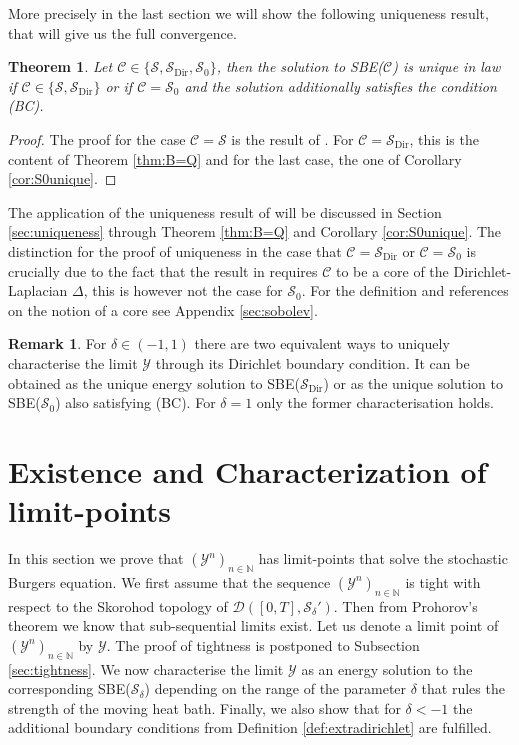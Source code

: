 \documentclass[a4paper, reqno, 12pt]{amsart}
\theoremstyle{plain}
\newtheorem{theorem}[definition]{Theorem}
\theoremstyle{definition}
\newtheorem{remark}[definition]{Remark}
\newcommand{\N}{\mathbb{N}}
\newcommand{\Sdir}{\mathcal{S}_{\text{Dir}}}
\begin{document}
More precisely in the last section we will show the following uniqueness result, that will give us the full convergence. 

\begin{theorem}
 \label{thm:SBEunique}
    Let $\mathcal C \in \{ \mathcal S,\Sdir,\mathcal S_0\}$, then the solution to SBE($\mathcal C$) is unique in law  if $\mathcal C\in \{ \mathcal S,\Sdir\}$ or if $\mathcal C = \mathcal S_0$ and the solution additionally satisfies the condition (BC).
\end{theorem}

\begin{proof}
    The proof for the case $\mathcal C = \mathcal S$ is the result of \cite{GP18}. For $\mathcal C = \Sdir$, this is the content of Theorem \ref{thm:B=Q} and for the last case, the one of Corollary \ref{cor:S0unique}.
\end{proof}


The application of the uniqueness result of \cite{GPP24} will be discussed in Section \ref{sec:uniqueness} through Theorem \ref{thm:B=Q} and Corollary \ref{cor:S0unique}. The distinction for the proof of uniqueness in the case that $\mathcal C = \Sdir$ or $\mathcal C = \mathcal S_0$ is crucially due to the fact that the result in \cite{GPP24} requires $\mathcal C$ to be a core of the Dirichlet-Laplacian $\Delta$, this is however not the case for $\mathcal S_0$. For the definition and references on the notion of a core see Appendix \ref{sec:sobolev}.

\begin{remark}
 For $\delta \in (-1,1)$ there are two equivalent ways to uniquely characterise the limit $\mathcal Y$ through its Dirichlet boundary condition. It can be obtained as the unique energy solution to SBE($\Sdir$) or as the unique solution to SBE($\mathcal S_0$) also satisfying (BC). For $\delta = 1$ only the former characterisation holds. 
\end{remark}



\section{Existence and Characterization of limit-points} 
\label{sec:existenceandtightness}

In this section we prove that $(\mathcal Y^n)_{n\in \N}$ has limit-points that solve the stochastic Burgers equation. We first assume that the sequence  $(\mathcal{Y}^n)_{n \in \mathbb N}$ is tight with respect to the Skorohod topology of  $\mathcal{D}([0,T],\mathcal{S}_{\delta}')$. Then from Prohorov's theorem we know that sub-sequential limits exist. Let us denote a limit point of $(\mathcal{Y}^n)_{n \in \mathbb N}$ by $\mathcal{Y}$. The proof of tightness is postponed to Subsection \ref{sec:tightness}. We now characterise the limit $\mathcal{Y}$ as an energy solution to the corresponding SBE($\mathcal S_\delta$) depending on the range of the parameter $\delta$ that rules the strength of the moving heat bath. Finally, we also show that for $\delta<-1$ the additional boundary conditions from Definition \ref{def:extradirichlet} are fulfilled. 
\end{document}
